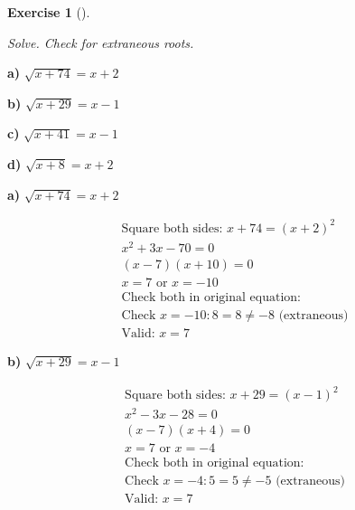\documentclass[
  letterpaper,
  DIV=11,
  numbers=noendperiod]{scrreprt}
\theoremstyle{definition}
\newtheorem{exercise}{Exercise}[chapter]
\theoremstyle{remark}
\begin{document}
\begin{exercise}[]\protect\hypertarget{exr-u6-37}{}\label{exr-u6-37}

\emph{Solve. Check for extraneous roots.}

\textbf{a)} \(\displaystyle \sqrt{x + 74} = x + 2\)

\textbf{b)} \(\displaystyle \sqrt{x + 29} = x - 1\)

\textbf{c)} \(\displaystyle \sqrt{x + 41} = x - 1\)

\textbf{d)} \(\displaystyle \sqrt{x + 8} = x + 2\)

\begin{tcolorbox}[enhanced jigsaw, opacitybacktitle=0.6, coltitle=black, arc=.35mm, colframe=quarto-callout-tip-color-frame, colback=white, bottomrule=.15mm, left=2mm, colbacktitle=quarto-callout-tip-color!10!white, titlerule=0mm, opacityback=0, title=\textcolor{quarto-callout-tip-color}{\faLightbulb}\hspace{0.5em}{🔍 View Solutions}, leftrule=.75mm, breakable, rightrule=.15mm, bottomtitle=1mm, toptitle=1mm, toprule=.15mm]

\textbf{a)} \(\displaystyle \sqrt{x + 74} = x + 2\)

\begin{align*}
\text{Square both sides: } x + 74 = (x + 2)^2 \\ x^2 + 3x - 70 = 0 \\ (x -7)(x + 10) = 0 \\ x = 7 \text{ or } x = -10 \\ \text{Check both in original equation:} \\ \text{Check } x=-10: 8 = 8 \neq -8 \text{ (extraneous)} \\ \text{Valid: } x = 7
\end{align*}

\textbf{b)} \(\displaystyle \sqrt{x + 29} = x - 1\)

\begin{align*}
\text{Square both sides: } x + 29 = (x - 1)^2 \\ x^2 - 3x - 28 = 0 \\ (x -7)(x + 4) = 0 \\ x = 7 \text{ or } x = -4 \\ \text{Check both in original equation:} \\ \text{Check } x=-4: 5 = 5 \neq -5 \text{ (extraneous)} \\ \text{Valid: } x = 7
\end{align*}


\end{tcolorbox}
\end{exercise}
\end{document}
